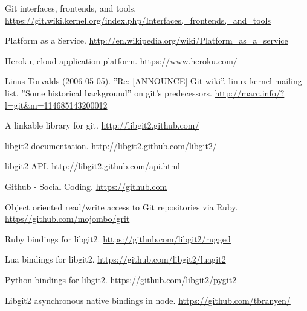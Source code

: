 \begin{thebibliography}{99}
 Git interfaces, frontends, and tools.
  \url{https://git.wiki.kernel.org/index.php/Interfaces,_frontends,_and_tools}

 Platform as a Service.
  \url{http://en.wikipedia.org/wiki/Platform_as_a_service}

 Heroku, cloud application platform.
  \url{https://www.heroku.com/}

 Linus Torvalds (2006-05-05). ”Re: [ANNOUNCE] Git wiki”.
  linux-kernel mailing list. ”Some historical background” on git’s predecessors.
  \url{http://marc.info/?l=git\&m=114685143200012}

 A linkable library for git.
  \url{http://libgit2.github.com/}

 libgit2 documentation.
  \url{http://libgit2.github.com/libgit2/}

 libgit2 API.
  \url{http://libgit2.github.com/api.html}

 Github - Social Coding.
  \url{https://github.com}

 Object oriented read/write access to Git repositories via Ruby.
  \url{https//github.com/mojombo/grit}

 Ruby bindings for libgit2.
  \url{https://github.com/libgit2/rugged}

 Lua bindings for libgit2.
  \url{https://github.com/libgit2/luagit2}

 Python bindings for libgit2.
  \url{https://github.com/libgit2/pygit2}

 Libgit2 asynchronous native bindings in node.
  \url{https://github.com/tbranyen/}

\end{thebibliography}
